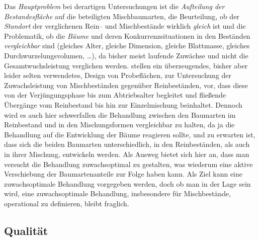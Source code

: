 \documentclass[twocolumn]{scrartcl}
\begin{document}
Das \emph{Hauptproblem} bei derartigen Untersuchungen ist die \emph{Aufteilung
der Bestandesfläche} auf die beteiligten Mischbaumarten, die Beurteilung, ob der
\emph{Standort} der verglichenen Rein-- und Mischbestände wirklich \emph{gleich}
ist und die Problematik, ob die \emph{Bäume} und deren Konkurrenzsituationen in
den Beständen \emph{vergleichbar} sind (gleiches Alter, gleiche Dimension,
gleiche Blattmasse, gleiches Durchwurzelungsvolumen, \dots), da bisher meist
laufende Zuwächse und nicht die Gesamtwuchsleistung verglichen werden.
\cite{vanclay2013mixedSpecies,vanclay2021ExperimentsMixedSpecies}
stellen ein überzeugendes, bisher aber leider selten verwendetes, Design von
Probeflächen, zur Untersuchung der Zuwachsleistung von Mischbeständen gegenüber Reinbeständen, vor, dass diese von der Verjüngungsphase bis zum Abtriebsalter begleitet und fließende Übergänge vom Reinbestand bis hin zur Einzelmischung beinhaltet. Dennoch wird es auch hier schwerfallen die Behandlung zwischen den Baumarten im Reinbestand und in den Mischungsformen vergleichbar zu halten, da ja die Behandlung auf die Entwicklung der Bäume reagieren sollte, und zu erwarten ist, dass sich die beiden Baumarten unterschiedlich, in den Reinbeständen, als auch in ihrer Mischung, entwickeln werden. Als Ausweg bietet sich hier an, dass man versucht die Behandlung zuwachsoptimal zu gestalten, was wiederum eine aktive Verschiebung der Baumartenanteile zur Folge haben kann. Als Ziel kann eine zuwachsoptimale Behandlung vorgegeben werden, doch ob man in der Lage sein wird, eine zuwachsoptimale Behandlung, insbesondere für Mischbestände, operational zu definieren, bleibt fraglich.

\subsection{Qualität}
\label{ssec:qualitaet}
\end{document}
